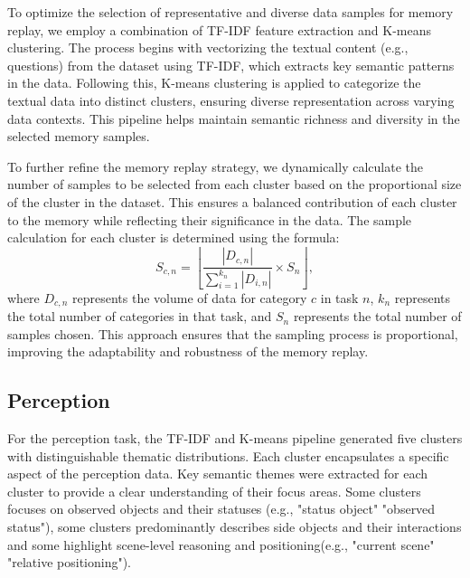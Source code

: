 To optimize the selection of representative and diverse data samples for memory replay, we employ a combination of TF-IDF feature extraction and K-means clustering. The process begins with vectorizing the textual content (e.g., questions) from the dataset using TF-IDF, which extracts key semantic patterns in the data. Following this, K-means clustering is applied to categorize the textual data into distinct clusters, ensuring diverse representation across varying data contexts. This pipeline helps maintain semantic richness and diversity in the selected memory samples.

To further refine the memory replay strategy, we dynamically calculate the number of samples to be selected from each cluster based on the proportional size of the cluster in the dataset. This ensures a balanced contribution of each cluster to the memory while reflecting their significance in the data. The sample calculation for each cluster is determined using the formula:
\begin{equation}
S_{c,n} = \left\lfloor \frac{|D_{c,n}|}{\sum_{i=1}^{k_n} |D_{i,n}|} \times S_n \right\rfloor,
\end{equation}
where \( D_{c,n} \) represents the volume of data for category \( c \) in task \( n \), \( k_n \) represents the total number of categories in that task, and \( S_n \) represents the total number of samples chosen. This approach ensures that the sampling process is proportional, improving the adaptability and robustness of the memory replay.

\subsection{Perception}
For the perception task, the TF-IDF and K-means pipeline generated five clusters with distinguishable thematic distributions. Each cluster encapsulates a specific aspect of the perception data. Key semantic themes were extracted for each cluster to provide a clear understanding of their focus areas. Some clusters focuses on observed objects and their statuses (e.g., "status object" "observed status"), some clusters predominantly describes side objects and their interactions and some highlight scene-level reasoning and positioning(e.g., "current scene" "relative positioning").


